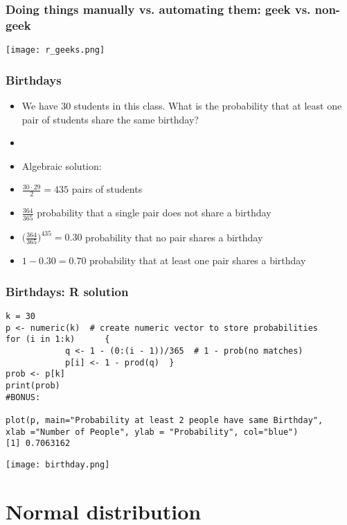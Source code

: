 \documentclass[xcolor=dvipsnames, 9pt]{beamer} %
\begin{document}
\begin{frame}
\frametitle{Doing things manually vs. automating them: geek vs. non-geek}
\begin{center}
\texttt{[image: r\_geeks.png]}
\end{center}
\end{frame}

\begin{frame}
\frametitle{Birthdays}
\begin{itemize}
	\itemsep\setlength{1em}
\item We have 30 students in this class. What is the probability that at least one pair of students share the same birthday?
\item[]
\item Algebraic solution:
\item[] $\frac{30 \cdot 29}{2} = 435$ pairs of students
\item[] $\frac{364}{365}$ probability that a single pair does not share a birthday
\item[] $\bigg( \frac{364}{365} \bigg)^{435} = 0.30$ probability that no pair shares a birthday
\item[] $1 - 0.30 = 0.70$ probability that at least one pair shares a birthday
\end{itemize}
\end{frame}

\begin{frame}[fragile]
\frametitle{Birthdays: \textsf{R} solution}
\begin{center}
\begin{scriptsize}
\begin{verbatim}
k = 30  
p <- numeric(k)  # create numeric vector to store probabilities
for (i in 1:k)      {
            q <- 1 - (0:(i - 1))/365  # 1 - prob(no matches)
            p[i] <- 1 - prod(q)  }
prob <- p[k]
print(prob)
#BONUS: 

plot(p, main="Probability at least 2 people have same Birthday", 
xlab ="Number of People", ylab = "Probability", col="blue")
[1] 0.7063162
\end{verbatim}
\end{scriptsize}
\texttt{[image: birthday.png]}
\end{center}
\end{frame}

\section{Normal distribution}
\end{document}
